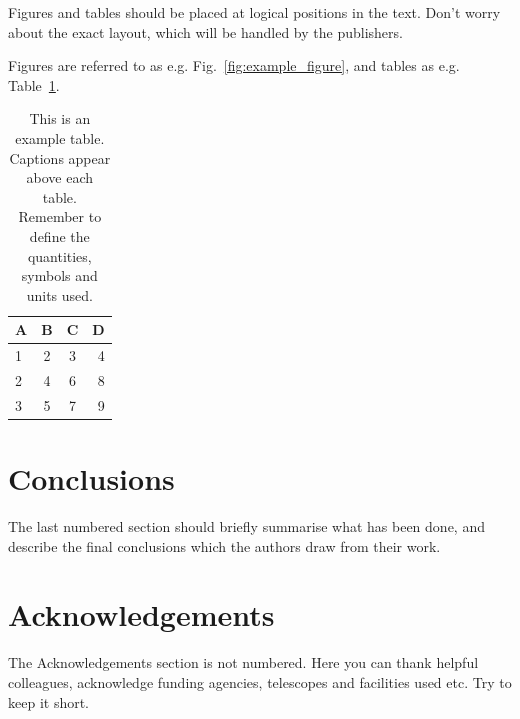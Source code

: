 \documentclass[a4paper,fleqn,usenatbib]{mnras}
\begin{document}
Figures and tables should be placed at logical positions in the text. Don't worry about the exact layout, which will be handled by the publishers.

Figures are referred to as e.g. Fig.~\ref{fig:example_figure}, and tables as
e.g. Table~\ref{tab:example_table}.


\begin{table}
	\centering
	\caption{This is an example table. Captions appear above each table.
	Remember to define the quantities, symbols and units used.}
	\label{tab:example_table}
	\begin{tabular}{lccr} %
		\hline
		A & B & C & D\\
		\hline
		1 & 2 & 3 & 4\\
		2 & 4 & 6 & 8\\
		3 & 5 & 7 & 9\\
		\hline
	\end{tabular}
\end{table}


\section{Conclusions}

The last numbered section should briefly summarise what has been done, and describe
the final conclusions which the authors draw from their work.

\section*{Acknowledgements}

The Acknowledgements section is not numbered. Here you can thank helpful
colleagues, acknowledge funding agencies, telescopes and facilities used etc.
Try to keep it short.







\end{document}
